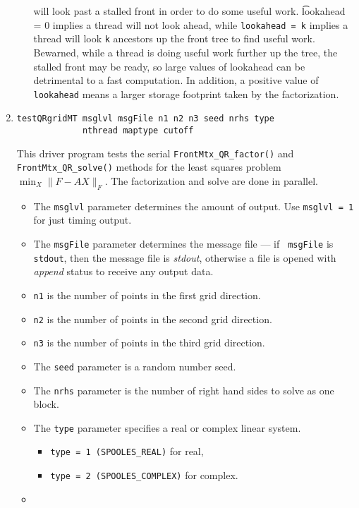 \begin{enumerate}
\begin{itemize}
will look past a stalled front in order to do some useful work.
{\t lookahead = 0} implies a thread will not look ahead, while
{\tt lookahead = k} implies a thread will look {\tt k} ancestors up
the front tree to find useful work.
Bewarned, while a thread is doing useful work further up the tree,
the stalled front may be ready, so large values of lookahead can be
detrimental to a fast computation.
In addition, a positive value of {\tt lookahead} means a larger
storage footprint taken by the factorization.
\end{itemize}
\item
\begin{verbatim}
testQRgridMT msglvl msgFile n1 n2 n3 seed nrhs type
             nthread maptype cutoff
\end{verbatim}
This driver program tests the serial {\tt FrontMtx\_QR\_factor()}
and {\tt FrontMtx\_QR\_solve()} methods for the least squares problem
$\min_X \| F - A X \|_F$.
The factorization and solve are done in parallel.
\par
\begin{itemize}
\item
The {\tt msglvl} parameter determines the amount of output.
Use {\tt msglvl = 1} for just timing output.
\item
The {\tt msgFile} parameter determines the message file --- if {\tt
msgFile} is {\tt stdout}, then the message file is {\it stdout},
otherwise a file is opened with {\it append} status to receive any
output data.
\item
{\tt n1} is the number of points in the first grid direction.
\item
{\tt n2} is the number of points in the second grid direction.
\item
{\tt n3} is the number of points in the third grid direction.
\item
The {\tt seed} parameter is a random number seed.
\item
The {\tt nrhs} parameter is the number of right hand sides to solve
as one block.
\item
The {\tt type} parameter specifies a real or complex linear system.
\begin{itemize}
\item
{\tt type = 1 (SPOOLES\_REAL)} for real,
\item
{\tt type = 2 (SPOOLES\_COMPLEX)} for complex.
\end{itemize}
\item

\end{itemize}
\end{enumerate}
